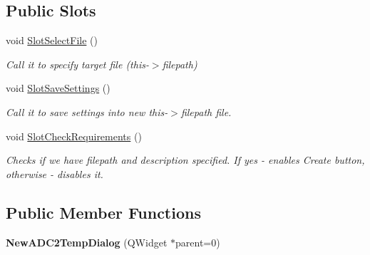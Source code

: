 \subsection*{Public Slots}
\begin{DoxyCompactItemize}
\item 
\mbox{\label{class_new_a_d_c2_temp_dialog_aecb2c340ccb0c4ceb395ba688c092317}} 
void \hyperlink{class_new_a_d_c2_temp_dialog_aecb2c340ccb0c4ceb395ba688c092317}{Slot\+Select\+File} ()
\begin{DoxyCompactList}\small\item\em Call it to specify target file (this-\/$>$filepath) \end{DoxyCompactList}\item 
\mbox{\label{class_new_a_d_c2_temp_dialog_a59b42efcbe03d9429250558eebaf6dd3}} 
void \hyperlink{class_new_a_d_c2_temp_dialog_a59b42efcbe03d9429250558eebaf6dd3}{Slot\+Save\+Settings} ()
\begin{DoxyCompactList}\small\item\em Call it to save settings into new this-\/$>$filepath file. \end{DoxyCompactList}\item 
\mbox{\label{class_new_a_d_c2_temp_dialog_afe68e82283f8cf518d6df9fafcea2a43}} 
void \hyperlink{class_new_a_d_c2_temp_dialog_afe68e82283f8cf518d6df9fafcea2a43}{Slot\+Check\+Requirements} ()
\begin{DoxyCompactList}\small\item\em Checks if we have filepath and description specified. If yes -\/ enables Create button, otherwise -\/ disables it. \end{DoxyCompactList}\end{DoxyCompactItemize}
\subsection*{Public Member Functions}
\begin{DoxyCompactItemize}
\item 
\mbox{\label{class_new_a_d_c2_temp_dialog_a4c7f66049c9ac670cb577700fde06eac}} 
{\bfseries New\+A\+D\+C2\+Temp\+Dialog} (Q\+Widget $\ast$parent=0)
\end{DoxyCompactItemize}
